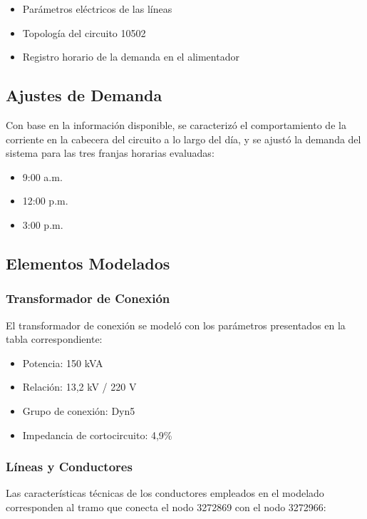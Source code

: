 \begin{itemize}
    \item Parámetros eléctricos de las líneas
    \item Topología del circuito 10502
    \item Registro horario de la demanda en el alimentador
\end{itemize}

\subsection{Ajustes de Demanda}

Con base en la información disponible, se caracterizó el comportamiento de la corriente en la cabecera del circuito a lo largo del día, y se ajustó la demanda del sistema para las tres franjas horarias evaluadas:

\begin{itemize}
    \item 9:00 a.m.
    \item 12:00 p.m.
    \item 3:00 p.m.
\end{itemize}

\subsection{Elementos Modelados}

\subsubsection{Transformador de Conexión}

El transformador de conexión se modeló con los parámetros presentados en la tabla correspondiente:

\begin{itemize}
    \item Potencia: 150 kVA
    \item Relación: 13,2 kV / 220 V
    \item Grupo de conexión: Dyn5
    \item Impedancia de cortocircuito: 4,9\%
\end{itemize}

\subsubsection{Líneas y Conductores}

Las características técnicas de los conductores empleados en el modelado corresponden al tramo que conecta el nodo 3272869 con el nodo 3272966:

